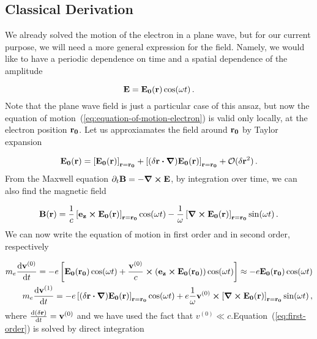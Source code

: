 \documentclass[12pt, class=report, crop=false]{standalone}
\begin{document}
\subsection{Classical Derivation}

We already solved the motion of the electron in a plane wave, but for our current purpose, we will need a more general expression for the field. Namely, we would like to have a periodic dependence on time and a spatial dependence of the amplitude

\begin{equation}
  \vb{E} = \vb{E_0}(\vb{r}) \cos(\omega t)\,.
\end{equation}
Note that the plane wave field is just a particular case of this ansaz, but now the equation of motion~(\ref{eq:equation-of-motion-electron}) is valid only locally, at the electron position \(\vb{r_0}\). Let us approxiamates the field around \(\vb{r_0}\) by Taylor expansion

\begin{equation}
  \vb{E_0}(\vb{r}) = \left[\vb{E_0}(\vb{r})\right]_{\vb{r}=\vb{r_0}} + \left[(\delta \vb{r}\vdot\grad)\vb{E_0}(\vb{r})\right] _{\vb{r}=\vb{r_0}} + \mathcal{O}(\delta\vb{r}^2)\,.
\end{equation}
From the Maxwell equation \(\partial_t \vb{B} = - \curl{\vb{E}}\), by integration over time, we can also find the magnetic field

\begin{equation}
  \vb{B}(\vb{r}) =\frac{1}{c}\left[\vb{e_z} \cp \vb{E_0}(\vb{r})\right]_{\vb{r}=\vb{r_0}} \cos(\omega t) - \frac{1}{\omega} \left[\curl{\vb{E_0}(\vb{r})}\right]_{\vb{r}=\vb{r_0}} \sin(\omega t)\,.
\end{equation}
We can now write the equation of motion in first order and in second order, respectively

\begin{subequations}
  \begin{align}
    \label{eq:first-order}
    m_e \dv{\vb{v}^{(0)}}{t} = - e \left[\vb{E_0}(\vb{r_0}) \cos(\omega t) + \frac{\vb{v}^{(0)}}{c}\cp \left(\vb{e_z} \cp \vb{E_0}(\vb{r_0}) \right) \cos(\omega t)\right] \approx - e \vb{E_0}(\vb{r_0}) \cos(\omega t)\\
    \label{eq:second-order}
    m_e\dv{\vb{v}^{(1)}}{t} = - e \left[ (\delta\vb{r}\vdot\grad) \vb{E_0}(\vb{r})\right]_{\vb{r}=\vb{r_0}} \cos(\omega t) + e \frac{1}{\omega} \vb{v}^{(0)}\cp \left[\curl{\vb{E_0}(\vb{r})}\right]_{\vb{r}=\vb{r_0}} \sin(\omega t) \,,
  \end{align}
\end{subequations}
where \(\dv{(\delta \vb{r})}{t} = \vb{v}^{(0)}\) and we have used the fact that \(v^{(0)}\ll c\).Equation~(\ref{eq:first-order}) is solved by direct integration
\end{document}
